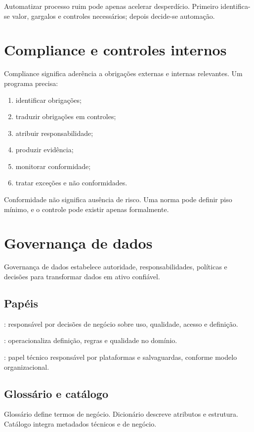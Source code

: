 Automatizar processo ruim pode apenas acelerar desperdício. Primeiro identifica-se valor, gargalos e controles necessários; depois decide-se automação.

\section{Compliance e controles internos}

Compliance significa aderência a obrigações externas e internas relevantes. Um programa precisa:
\begin{enumerate}
\item identificar obrigações;
\item traduzir obrigações em controles;
\item atribuir responsabilidade;
\item produzir evidência;
\item monitorar conformidade;
\item tratar exceções e não conformidades.
\end{enumerate}

Conformidade não significa ausência de risco. Uma norma pode definir piso mínimo, e o controle pode existir apenas formalmente.

\section{Governança de dados}

Governança de dados estabelece autoridade, responsabilidades, políticas e decisões para transformar dados em ativo confiável.

\subsection{Papéis}

: responsável por decisões de negócio sobre uso, qualidade, acesso e definição.

: operacionaliza definição, regras e qualidade no domínio.

: papel técnico responsável por plataformas e salvaguardas, conforme modelo organizacional.

\subsection{Glossário e catálogo}

Glossário define termos de negócio. Dicionário descreve atributos e estrutura. Catálogo integra metadados técnicos e de negócio.

